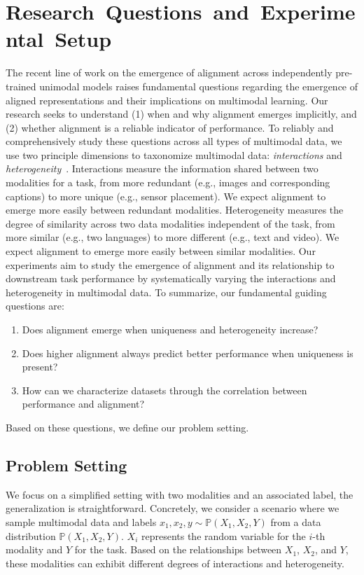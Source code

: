 \section{\mbox{Research Questions and Experimental Setup}}

The recent line of work on the emergence of alignment across independently pre-trained unimodal models raises fundamental questions regarding the emergence of aligned representations and their implications on multimodal learning. Our research seeks to understand (1) when and why alignment emerges implicitly, and (2) whether alignment is a reliable indicator of performance. To reliably and comprehensively study these questions across all types of multimodal data, we use two principle dimensions to taxonomize multimodal data: \textit{interactions} and \textit{heterogeneity}~\citep{baltruvsaitis2018multimodal,liang2024foundations,tian2020makes}. Interactions measure the information shared between two modalities for a task, from more redundant (e.g., images and corresponding captions) to more unique (e.g., sensor placement). We expect alignment to emerge more easily between redundant modalities. Heterogeneity measures the degree of similarity across two data modalities independent of the task, from more similar (e.g., two languages) to more different (e.g., text and video). We expect alignment to emerge more easily between similar modalities. 
Our experiments aim to study the emergence of alignment and its relationship to downstream task performance by systematically varying the interactions and heterogeneity in multimodal data. To summarize, our fundamental guiding questions are:
\begin{enumerate}[noitemsep,topsep=0pt,nosep,leftmargin=*,parsep=0pt,partopsep=0pt]
    \item Does alignment emerge when uniqueness and heterogeneity increase?
    \item Does higher alignment always predict better performance when uniqueness is present?
    \item How can we characterize datasets through the correlation between performance and alignment?
\end{enumerate}
Based on these questions, we define our problem setting.

\subsection{Problem Setting}

We focus on a simplified setting with two modalities and an associated label, the generalization is straightforward. Concretely, we consider a scenario where we sample multimodal data and labels \(x_1, x_2, y \sim \mathbb{P}(X_1, X_2, Y)\) from a data distribution \(\mathbb{P}(X_1, X_2, Y)\). \(X_i\) represents the random variable for the $i$-th modality and \(Y\) for the task. Based on the relationships between $X_1$, $X_2$, and $Y$, these modalities can exhibit different degrees of interactions and heterogeneity.

